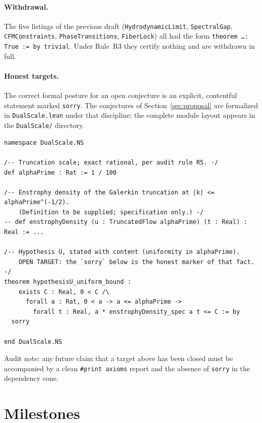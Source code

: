 \documentclass[11pt,a4paper]{article}
\theoremstyle{plain}
\theoremstyle{definition}
\theoremstyle{remark}
\begin{document}
\paragraph{Withdrawal.} The five listings of the previous draft
(\texttt{HydrodynamicLimit}, \texttt{SpectralGap}, \texttt{CFMConstraints},
\texttt{PhaseTransitions}, \texttt{FiberLock}) all had the form
\texttt{theorem \ldots : True := by trivial}. Under Rule~R3 they certify
nothing and are withdrawn in full.

\paragraph{Honest targets.} The correct formal posture for an open
conjecture is an explicit, contentful statement marked \texttt{sorry}. The
conjectures of Section~\ref{sec:proposal} are formalized in
\texttt{DualScale.lean} under that discipline; the complete module layout
appears in the \texttt{DualScale/} directory.

\begin{lstlisting}[caption={Formal target (OPEN). \texttt{sorry} = unproven; this listing is a specification, not a verification.}]
namespace DualScale.NS

/-- Truncation scale; exact rational, per audit rule R5. -/
def alphaPrime : Rat := 1 / 100

/-- Enstrophy density of the Galerkin truncation at |k| <= alphaPrime^(-1/2).
    (Definition to be supplied; specification only.) -/
-- def enstrophyDensity (u : TruncatedFlow alphaPrime) (t : Real) : Real := ...

/-- Hypothesis U, stated with content (uniformity in alphaPrime).
    OPEN TARGET: the `sorry` below is the honest marker of that fact. -/
theorem hypothesisU_uniform_bound :
    exists C : Real, 0 < C /\
      forall a : Rat, 0 < a -> a <= alphaPrime ->
        forall t : Real, a * enstrophyDensity_spec a t <= C := by
  sorry

end DualScale.NS
\end{lstlisting}

\noindent Audit note: any future claim that a target above has been closed
must be accompanied by a clean \texttt{\#print axioms} report and the
absence of \texttt{sorry} in the dependency cone.

\section{Milestones}\label{sec:milestones}
\end{document}
